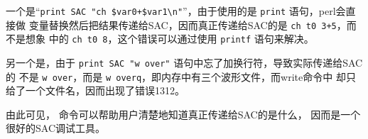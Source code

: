 一个是``\verb|print SAC "ch $var0+$var1\n"|''，由于使用的是 \texttt{print} 语句，perl会直接做
变量替换然后把结果传递给SAC，因而真正传递给SAC的是 \texttt{ch t0 3+5}，而不是想象
中的 \texttt{ch t0 8}，这个错误可以通过使用 \texttt{printf} 语句来解决。

另一个是，由于 \texttt{print SAC "w over"} 语句中忘了加换行符，导致实际传递给SAC的
不是 \texttt{w over}，而是 \texttt{w overq}，即内存中有三个波形文件，而write命令中
却只给了一个文件名，因而出现了错误1312。

由此可见， 命令可以帮助用户清楚地知道真正传递给SAC的是什么，
因而是一个很好的SAC调试工具。
